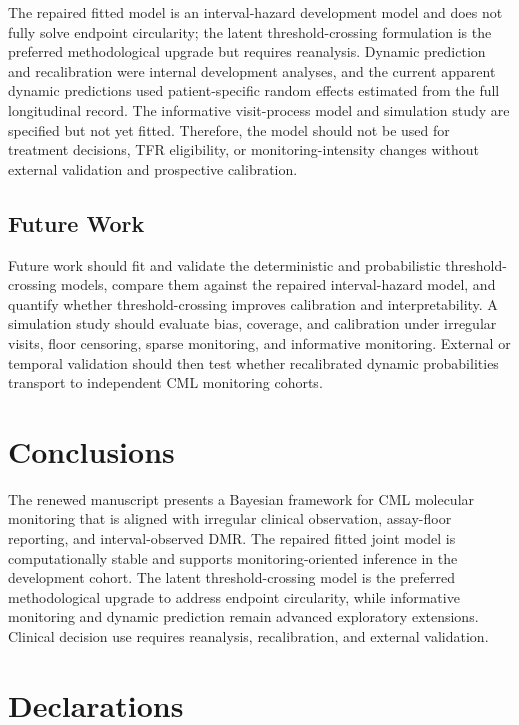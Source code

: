 \documentclass[11pt]{article}
\begin{document}
The repaired fitted model is an interval-hazard development model and does not fully solve endpoint circularity; the latent threshold-crossing formulation is the preferred methodological upgrade but requires reanalysis. Dynamic prediction and recalibration were internal development analyses, and the current apparent dynamic predictions used patient-specific random effects estimated from the full longitudinal record. The informative visit-process model and simulation study are specified but not yet fitted. Therefore, the model should not be used for treatment decisions, TFR eligibility, or monitoring-intensity changes without external validation and prospective calibration.

\subsection{Future Work}

Future work should fit and validate the deterministic and probabilistic threshold-crossing models, compare them against the repaired interval-hazard model, and quantify whether threshold-crossing improves calibration and interpretability. A simulation study should evaluate bias, coverage, and calibration under irregular visits, floor censoring, sparse monitoring, and informative monitoring. External or temporal validation should then test whether recalibrated dynamic probabilities transport to independent CML monitoring cohorts.

\section{Conclusions}

The renewed manuscript presents a Bayesian framework for CML molecular monitoring that is aligned with irregular clinical observation, assay-floor reporting, and interval-observed DMR. The repaired fitted joint model is computationally stable and supports monitoring-oriented inference in the development cohort. The latent threshold-crossing model is the preferred methodological upgrade to address endpoint circularity, while informative monitoring and dynamic prediction remain advanced exploratory extensions. Clinical decision use requires reanalysis, recalibration, and external validation.

\section*{Declarations}
\end{document}
